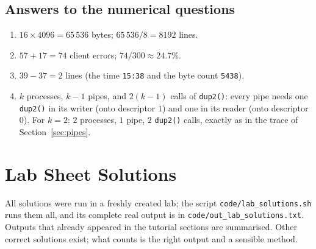 \documentclass[11pt,a4paper]{article}
\newcommand{\cmd}[1]{\texttt{#1}}
\begin{document}
\subsection*{Answers to the numerical questions}
\begin{enumerate}[leftmargin=1.6em,start=9]
  \item $16 \times 4096 = 65\,536$ bytes; $65\,536 / 8 = 8192$ lines.
  \item $57 + 17 = 74$ client errors; $74/300 \approx 24.7\%$.
  \item $39 - 37 = 2$ lines (the time \texttt{15:38} and the byte count \texttt{5438}).
  \item $k$ processes, $k-1$ pipes, and $2(k-1)$ calls of \cmd{dup2()}: every pipe needs one \cmd{dup2()} in its writer (onto descriptor $1$) and one in its reader (onto descriptor $0$). For $k = 2$: $2$ processes, $1$ pipe, $2$ \cmd{dup2()} calls, exactly as in the trace of Section~\ref{sec:pipes}.
\end{enumerate}

\section{Lab Sheet Solutions}
\label{sec:sol}

All solutions were run in a freshly created lab; the script \cmd{code/lab\_solutions.sh} runs them all, and its complete real output is in \cmd{code/out\_lab\_solutions.txt}. Outputs that already appeared in the tutorial sections are summarised. Other correct solutions exist; what counts is the right output and a sensible method.
\end{document}
